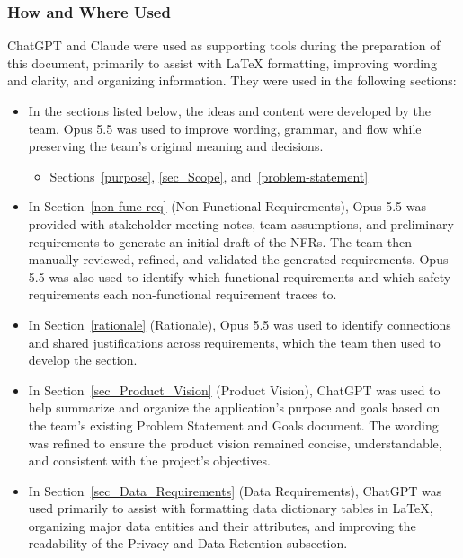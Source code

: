 \documentclass[10pt]{article}
\begin{document}
\subsubsection*{How and Where Used}

ChatGPT and Claude were used as supporting tools during the preparation of
this document, primarily to assist with \LaTeX{} formatting,
improving wording and clarity, and organizing information.
They were used in the following sections:

\begin{itemize}
    \item In the sections listed below, the ideas and content
    were developed by the team. Opus 5.5 was used to improve wording,
    grammar, and flow while preserving the team's original meaning and decisions.

    \begin{itemize}
        \item Sections~\ref{purpose}, \ref{sec_Scope}, and~\ref{problem-statement}
    \end{itemize}

    \item In Section~\ref{non-func-req} (Non-Functional Requirements), Opus 5.5 was
    provided with stakeholder meeting notes, team assumptions, and preliminary requirements
    to generate an initial draft of the NFRs. The team then manually reviewed, refined,
    and validated the generated requirements. Opus 5.5 was also used to identify which
    functional requirements and which safety requirements each non-functional requirement traces to.

    \item In Section~\ref{rationale} (Rationale), Opus 5.5 was used to identify connections
    and shared justifications across requirements, which the team then used to develop the section.

    \item In Section~\ref{sec_Product_Vision} (Product Vision),
    ChatGPT was used to help summarize and organize the
    application's purpose and goals based on the team's
    existing Problem Statement and Goals document.
    The wording was refined to ensure the product vision
    remained concise, understandable, and consistent
    with the project's objectives.

    \item In Section~\ref{sec_Data_Requirements} (Data Requirements),
    ChatGPT was used primarily to assist with formatting
    data dictionary tables in \LaTeX{}, organizing major
    data entities and their attributes, and improving
    the readability of the Privacy and Data Retention
    subsection.


\end{itemize}
\end{document}
